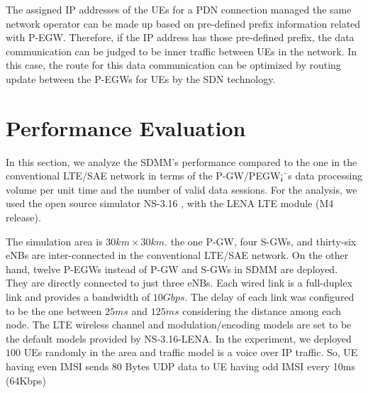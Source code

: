 \documentclass[runningheads,a4paper]{llncs}
\begin{document}
The assigned IP addresses of the UEs for a PDN connection managed the same network operator can be made up based on pre-defined prefix information related with P-EGW. Therefore, if the IP address has those pre-defined prefix, the data communication can be judged to be inner traffic between UEs in the network. In this case, the route for this data communication can be optimized by routing update between the P-EGWs for UEs by the SDN technology.


\section{Performance Evaluation}

In this section, we analyze the SDMM's performance compared to the one in the conventional LTE/SAE network in terms of the P-GW/PEGW¡¯s data processing volume per unit time and the number of valid data sessions. For the analysis, we used the open source simulator NS-3.16 \cite{ref13}, with the LENA LTE module (M4 release).

The simulation area is $30 km \times 30 km$. the one P-GW, four S-GWs, and thirty-six eNBs are inter-connected in the conventional LTE/SAE network. On the other hand, twelve P-EGWs instead of P-GW and S-GWs in SDMM are deployed. They are directly connected to just three eNBs. Each wired link is a full-duplex link and provides a bandwidth of $10 Gbps$. The delay of each link was configured to be the one between $25 ms$ and $125 ms$ considering the distance among each node. The LTE wireless channel and modulation/encoding models are set to be the default models provided by NS-3.16-LENA. In the experiment, we deployed $100$ UEs randomly in the area and traffic model is a voice over IP traffic. So, UE having even IMSI sends 80 Bytes UDP data to UE having odd IMSI every 10ms (64Kbps)
\end{document}
